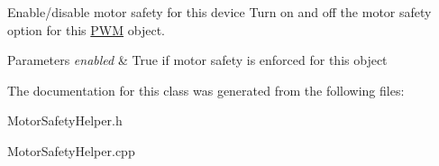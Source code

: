 \-Enable/disable motor safety for this device \-Turn on and off the motor safety option for this \hyperlink{classPWM}{\-P\-W\-M} object. 
\begin{DoxyParams}{\-Parameters}
{\em enabled} & \-True if motor safety is enforced for this object \\
\hline
\end{DoxyParams}


\-The documentation for this class was generated from the following files\-:\begin{DoxyCompactItemize}
\item 
\-Motor\-Safety\-Helper.\-h\item 
\-Motor\-Safety\-Helper.\-cpp\end{DoxyCompactItemize}
